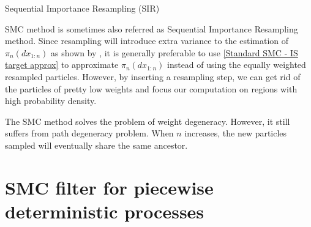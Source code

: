 \documentclass[12pt,a4paper]{article}
\begin{document}
\begin{algorithm}[htb!]
    \caption{Sequential Importance Resampling (SIR)}\label{Alg:SIR}
\end{algorithm}

SMC method is sometimes also referred as Sequential Importance Resampling method. Since resampling will introduce extra variance to the estimation of $\pi_{n}(dx_{1:n})$ as shown by \cite{chopin2004central}, it is generally preferable to use \eqref{Standard SMC - IS target approx} to approximate $\pi_n(dx_{1:n})$ instead of using the equally weighted resampled particles. However, by inserting a resampling step, we can get rid of the particles of pretty low weights and focus our computation on regions with high probability density. 

The SMC method solves the problem of weight degeneracy. However, it still suffers from path degeneracy problem. When $n$ increases, the new particles sampled will eventually share the same ancestor.
\section{SMC filter for piecewise deterministic processes}
\end{document}
